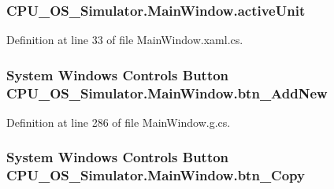\subsubsection[{active\+Unit}]{ C\+P\+U\+\_\+\+O\+S\+\_\+\+Simulator.\+Main\+Window.\+active\+Unit\hspace{0.3cm}{\ttfamily [private]}}\label{class_c_p_u___o_s___simulator_1_1_main_window_af00ce05444d9636c688974f706ef397b}


Definition at line 33 of file Main\+Window.\+xaml.\+cs.

\hypertarget{class_c_p_u___o_s___simulator_1_1_main_window_a50fb8fcd9e592c4987fac4bcb8762785}{}
\subsubsection[{btn\+\_\+\+Add\+New}]{\setlength{\rightskip}{0pt plus 5cm}System Windows Controls Button C\+P\+U\+\_\+\+O\+S\+\_\+\+Simulator.\+Main\+Window.\+btn\+\_\+\+Add\+New\hspace{0.3cm}{\ttfamily [package]}}\label{class_c_p_u___o_s___simulator_1_1_main_window_a50fb8fcd9e592c4987fac4bcb8762785}


Definition at line 286 of file Main\+Window.\+g.\+cs.

\hypertarget{class_c_p_u___o_s___simulator_1_1_main_window_a55b2516a7b78d0e79deac7f1a79f3a92}{}
\subsubsection[{btn\+\_\+\+Copy}]{\setlength{\rightskip}{0pt plus 5cm}System Windows Controls Button C\+P\+U\+\_\+\+O\+S\+\_\+\+Simulator.\+Main\+Window.\+btn\+\_\+\+Copy\hspace{0.3cm}{\ttfamily [package]}}\label{class_c_p_u___o_s___simulator_1_1_main_window_a55b2516a7b78d0e79deac7f1a79f3a92}


